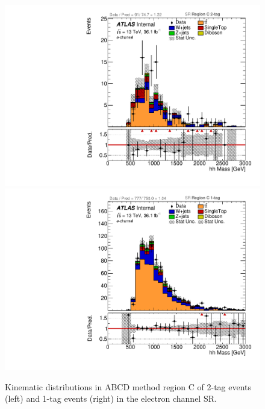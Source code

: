 \begin{figure}[!htbp]
\begin{center}
\includegraphics[scale=0.33]{./figures/boosted/ABCD_ScaledPrompt/elec_SR_RegionC_hhMass}
\includegraphics[scale=0.33]{./figures/boosted/ABCD_ScaledPrompt/elec_SR_RegionC_1tag_hhMass}
\caption{Kinematic distributions in ABCD method region C of 2-tag events (left) and 1-tag events (right) in the electron channel SR.}
\label{fig:boosted_abcd_scaledprompt_region_c_SR_elec}
\end{center}
\end{figure}

